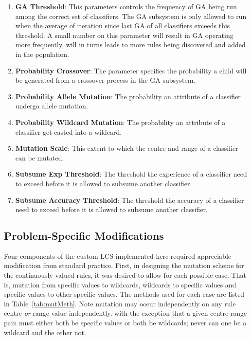 \documentclass[11pt]{article}
\begin{document}
\begin{enumerate}
	\item \textbf{GA Threshold}: This parameters controls the frequency of GA being run among the correct set of classifiers. The GA subsystem is only allowed to run when the average of iteration since last GA of all classifiers exceeds this threshold. A small number on this parameter will result in GA operating more frequently, will in turns leads to more rules being discovered and added in the population.
	\item \textbf{Probability Crossover}: The parameter specifies the probability a child will be generated from a crossover process in the GA subsystem.
	\item \textbf{Probability Allele Mutation}: The probability an attribute of a classifier undergo allele mutation.
	\item \textbf{Probability Wildcard Mutation}: The probability an attribute of a classifier get casted into a wildcard.
	\item \textbf{Mutation Scale}: This extent to which the centre and range of a classifier can be mutated.
	\item \textbf{Subsume Exp Threshold}: The threshold the experience of a classifier need to exceed before it is allowed to subsume another classifier.
	\item \textbf{Subsume Accuracy Threshold}: The threshold the accuracy of a classifier need to exceed before it is allowed to subsume another classifier.
\end{enumerate}










\subsection{Problem-Specific Modifications}
\label{sec:exp2mods}

Four components of the custom LCS implemented here required appreciable modification from standard practice. First, in designing the mutation scheme for the continuously-valued rules, it was desired to allow for each possible case. That is, mutation from specific values to wildcards, wildcards to specific values and specific values to other specific values. The methods used for each case are listed in Table~\ref{tab:mutMeth}. Note mutation may occur independently on any rule centre \textit{or} range value independently, with the exception that a given centre-range pain must either both be specific values or both be wildcards; never can one be a wildcard and the other not.
\end{document}
